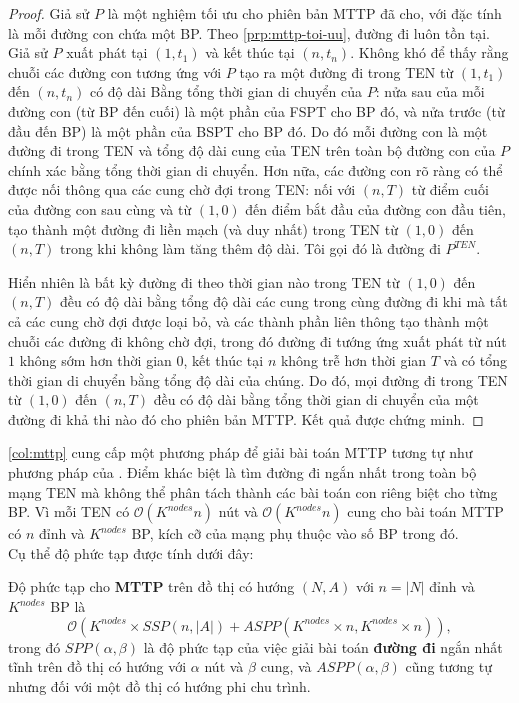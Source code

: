 \documentclass[../main.tex]{subfiles}
\begin{document}
\begin{proof} 

Giả sử \(P\) là một nghiệm tối ưu cho phiên bản MTTP đã cho, với đặc tính là 
mỗi đường con chứa một BP. Theo \autoref{prp:mttp-toi-uu}, đường đi luôn tồn tại.
Giả sử \(P\) xuất phát tại \((1,t_1)\) và kết thúc tại \((n,t_n)\). 
Không khó để thấy rằng chuỗi các đường con tương ứng với \(P\) tạo ra 
một đường đi trong TEN từ \((1, t_1)\) đến \((n, t_n)\) có độ dài Bằng 
tổng thời gian di chuyển của \(P\): nửa sau của mỗi đường con (từ BP 
đến cuối) là một phần của FSPT cho BP đó, và nửa trước (từ đầu đến BP) 
là một phần của BSPT cho BP đó. Do đó mỗi đường con là một đường đi 
trong TEN và tổng độ dài cung của TEN trên toàn bộ đường con của \(P\)
chính xác bằng tổng thời gian di chuyển.
Hơn nữa, các đường con rõ ràng có thể được nối thông qua các 
cung chờ đợi trong TEN: nối với \((n, T)\) từ điểm cuối của đường con sau cùng và từ \((1, 0)\) đến điểm bắt đầu của đường con đầu tiên, tạo thành một đường đi liền mạch (và duy nhất) trong TEN từ \((1, 0)\) đến \((n, T)\) trong khi không làm tăng thêm độ dài. Tôi gọi đó là đường đi \(P^{TEN}\).

Hiển nhiên là bất kỳ đường đi theo thời gian nào trong TEN từ \((1, 0) \) đến \((n ,T)\) đều có độ dài bằng tổng độ dài các cung trong cùng đường đi khi mà tất cả các cung chờ đợi được loại bỏ, và các thành phần liên thông tạo thành một chuỗi các đường đi không chờ đợi, trong đó đường đi tướng ứng xuất phát từ nút \(1\) không sớm hơn thời gian \(0\), kết thúc tại \(n\) không trễ hơn thời gian \(T\) và có tổng thời gian di chuyển bằng tổng độ dài của chúng. Do đó, mọi đường đi trong TEN từ \((1, 0)\) đến \((n, T)\) đều có độ dài bằng tổng thời gian di chuyển của một đường đi khả thi nào đó cho phiên bản MTTP.
Kết quả được chứng minh.
\end{proof}

\autoref{col:mttp} cung cấp một phương pháp để giải bài toán MTTP
tương tự như phương pháp của \cite{foschini2011complexity}. Điểm khác biệt
là tìm đường đi ngắn nhất trong toàn bộ mạng TEN mà không thể phân tách thành
các bài toán con riêng biệt cho từng BP. Vì mỗi TEN có \(\mathcal{O}(K^{nodes}n)\) nút 
và \(\mathcal{O}(K^{nodes}n)\) cung cho bài toán MTTP có \(n\) đỉnh và \(K^{nodes}\) BP,
kích cỡ của mạng phụ thuộc vào số BP trong đó. \\
Cụ thể độ phức tạp được tính dưới đây:

\begin{proposition}
\label{prp:dpt-mttp}
Độ phức tạp cho \textbf{MTTP} trên đồ thị
có hướng \((N,A)\) với \(n = |N|\) đỉnh và \(K^{nodes}\) BP là
\[ \mathcal{O}(K^{nodes} ×SSP(n,|A|)+ASPP(K^{nodes}\times n,K^{nodes}\times n)), \]
trong đó \(SPP(\alpha,\beta)\) là độ phức tạp của việc giải bài toán
\textbf{đường đi} ngắn nhất tĩnh trên đồ thị có hướng với \(\alpha\) nút
và \(\beta\) cung, và \(ASPP(\alpha,\beta)\) cũng tương tự nhưng đối với
một đồ thị có hướng phi chu trình.
\end{proposition}
\end{document}
